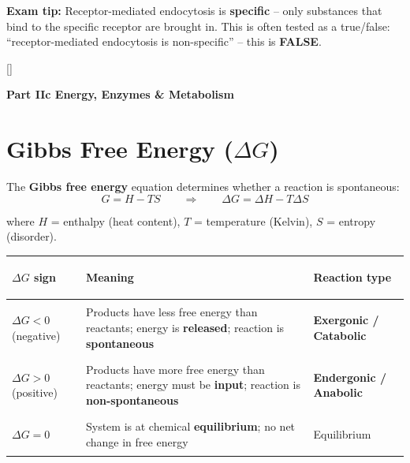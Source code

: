 \documentclass[11pt, letterpaper]{article}
\newcommand{\orangesections}{%
  \titleformat{\section}{\large\bfseries\color{sectionorange}}{}{0em}{}[\color{sectionorange}\titlerule]%
  \titleformat{\subsection}{\normalsize\bfseries\color{sectionorange!80!black}}{}{0em}{}%
}
\newcommand{\partbanner}[3]{%
  \begin{tcolorbox}[colback=#1, colframe=#2, boxrule=1.2pt, arc=4pt,
    left=8pt, right=8pt, top=6pt, bottom=6pt]
    \begin{center}{\LARGE\bfseries #3}\end{center}
  \end{tcolorbox}%
}
\begin{document}
\vspace{4pt}
\begin{tcolorbox}[colback=part5bg, colframe=sectionteal, arc=3pt, boxrule=1pt]
\textbf{Exam tip:} Receptor-mediated endocytosis is \textbf{specific} -- only substances that bind to the specific receptor are brought in. This is often tested as a true/false: ``receptor-mediated endocytosis is non-specific'' -- this is \textbf{FALSE}.
\end{tcolorbox}

\newpage

\orangesections
{}
\partbanner{part4bg}{sectionorange}{Part IIc \quad Energy, Enzymes \& Metabolism}

\vspace{8pt}

\section*{Gibbs Free Energy ($\Delta G$)}

The \textbf{Gibbs free energy} equation determines whether a reaction is spontaneous:
\[
  G = H - TS \qquad \Longrightarrow \qquad \Delta G = \Delta H - T\Delta S
\]

where $H$ = enthalpy (heat content), $T$ = temperature (Kelvin), $S$ = entropy (disorder).

\vspace{4pt}
\noindent
{\renewcommand{\arraystretch}{1.5}
\begin{tabularx}{\textwidth}{>{\bfseries\raggedright\arraybackslash}p{3cm}>{\raggedright\arraybackslash}X>{\raggedright\arraybackslash}p{4cm}}
\toprule
\rowcolor{tableheaderorange}
\textbf{$\Delta G$ sign} & \textbf{Meaning} & \textbf{Reaction type} \\
\midrule
\rowcolor{rowOr}
$\Delta G < 0$ (negative)
  & Products have less free energy than reactants; energy is \textbf{released}; reaction is \textbf{spontaneous}
  & \textbf{Exergonic / Catabolic} \\
\rowcolor{rowA}
$\Delta G > 0$ (positive)
  & Products have more free energy than reactants; energy must be \textbf{input}; reaction is \textbf{non-spontaneous}
  & \textbf{Endergonic / Anabolic} \\
\rowcolor{rowOr}
$\Delta G = 0$
  & System is at chemical \textbf{equilibrium}; no net change in free energy
  & Equilibrium \\
\bottomrule
\end{tabularx}}
\end{document}
